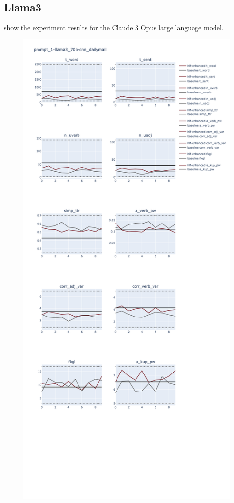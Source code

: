 \documentclass[11pt]{article}
\begin{document}
\subsection{Llama3}

show the experiment results for the Claude 3 Opus large language model.

\begin{figure}[ht]
    \includegraphics[width=\textwidth,height=0.9\textheight,scale=1]{plots/prompt_1/prompt_1-llama3_70b-cnn_dailymail/prompt_1-llama3_70b-cnn_dailymail.png}

\end{figure}
\end{document}

